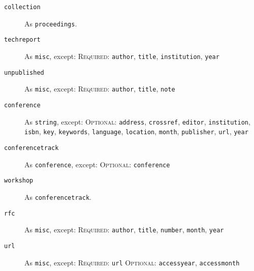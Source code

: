 \documentclass{article}
\begin{document}
\begin{description}
\item[\texttt{collection}] As \texttt{proceedings}.

\item[\texttt{techreport}] As \texttt{misc}, except:
\textsc{Required:} \texttt{author}, \texttt{title}, \texttt{institution}, \texttt{year}

\item[\texttt{unpublished}] As \texttt{misc}, except:
\textsc{Required:} \texttt{author}, \texttt{title}, \texttt{note}

\item[\texttt{conference}] As \texttt{string}, except:
\textsc{Optional:}
\texttt{address},
\texttt{crossref},
\texttt{editor},
\texttt{institution},
\texttt{isbn},
\texttt{key},
\texttt{keywords},
\texttt{language},
\texttt{location},
\texttt{month},
\texttt{publisher},
\texttt{url},
\texttt{year}

\item[\texttt{conferencetrack}] As \texttt{conference}, except:
\textsc{Optional:} \texttt{conference}

\item[\texttt{workshop}] As \texttt{conferencetrack}.

\item[\texttt{rfc}] As \texttt{misc}, except:
\textsc{Required:} \texttt{author}, \texttt{title}, \texttt{number}, \texttt{month}, \texttt{year}

\item[\texttt{url}] As \texttt{misc}, except:
\textsc{Required:} \texttt{url}
\textsc{Optional:} \texttt{accessyear}, \texttt{accessmonth}

\end{description}
\end{document}
